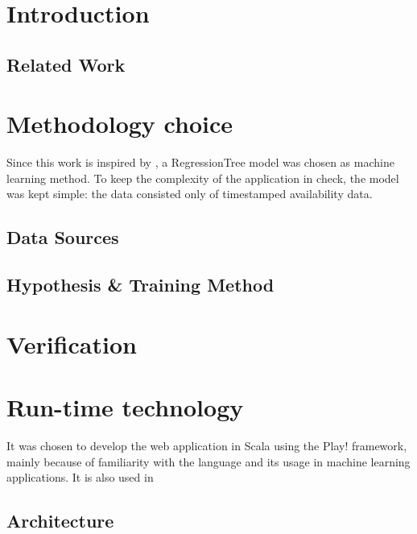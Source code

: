 \section{Introduction}


\subsection{Related Work}



\section{Methodology choice}

Since this work is inspired by \cite{parkendd}, a RegressionTree model was chosen as machine learning method. To keep the complexity of the application in check, the model was kept simple: the data consisted only of timestamped availability data.

\subsection{Data Sources}\label{data sources}


\subsection{Hypothesis \& Training Method}


\section{Verification}


\section{Run-time technology}

It was chosen to develop the web application in Scala using the Play! framework, mainly because of familiarity with the language and its usage in machine learning applications. It is also used in  

\subsection{Architecture}\label{sec:architecture}


